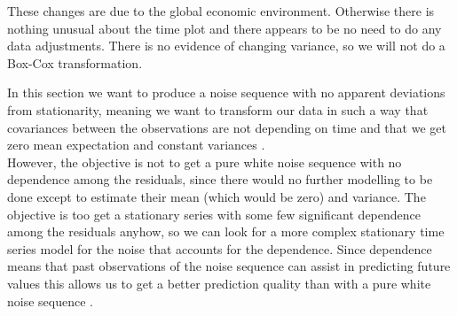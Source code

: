 \documentclass[11pt,a4paper]{article}
\begin{document}
These changes are due to the global economic environment. Otherwise there is nothing unusual about the time plot and there appears to be no need to do any data adjustments.
There is no evidence of changing variance, so we will not do a Box-Cox transformation.



In this section we want to produce a noise sequence with no apparent deviations from stationarity, meaning we want to transform our data in such a way that covariances between the observations are not depending on time and that we get zero mean expectation and constant variances \cite[pp.~14--23]{bd02}. \\
However, the objective is not to get a pure white noise sequence with no dependence among the residuals, since there would no further modelling to be done except to estimate their mean (which would be zero) and variance. The objective is too get a stationary series with some few significant dependence among the residuals anyhow, so we can look for a more complex stationary time series model for the noise that accounts for the dependence. Since dependence means that past observations of the noise sequence can assist in predicting future values this allows us to get a better prediction quality than with a pure white noise sequence \cite[p.~35]{bd02}. \\
\end{document}
